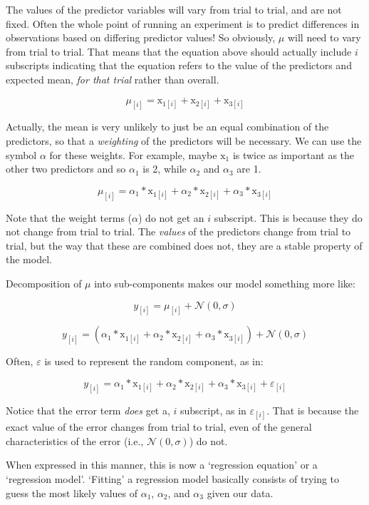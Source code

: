 \documentclass[
]{book}
\begin{document}
The values of the predictor variables will vary from trial to trial, and are not fixed. Often the whole point of running an experiment is to predict differences in observations based on differing predictor values! So obviously, \(\mu\) will need to vary from trial to trial. That means that the equation above should actually include \(i\) subscripts indicating that the equation refers to the value of the predictors and expected mean, \emph{for that trial} rather than overall.

\[
\mu_{[i]} = \mathrm{x}_{1[i]} + \mathrm{x}_{2[i]} + \mathrm{x}_{3[i]} \label{eq:5}
\]

Actually, the mean is very unlikely to just be an equal combination of the predictors, so that a \emph{weighting} of the predictors will be necessary. We can use the symbol \(\alpha\) for these weights. For example, maybe \(\mathrm{x}_{1}\) is twice as important as the other two predictors and so \(\alpha_1\) is 2, while \(\alpha_2\) and \(\alpha_3\) are 1.

\[
\mu_{[i]} = \alpha_1*\mathrm{x}_{1[i]} + \alpha_2*\mathrm{x}_{2[i]} + \alpha_3*\mathrm{x}_{3[i]}  
\label{eq:6}
\]

Note that the weight terms (\(\alpha\)) do not get an \(i\) subscript. This is because they do not change from trial to trial. The \emph{values} of the predictors change from trial to trial, but the way that these are combined does not, they are a stable property of the model.

Decomposition of \(\mu\) into sub-components makes our model something more like:

\[
y_{[i]} = \mu_{[i]} + \mathcal{N}(0,\sigma)  
\label{eq:7}
\]

\[
y_{[i]} =  (\alpha_1*\mathrm{x}_{1[i]} + \alpha_2*\mathrm{x}_{2[i]} + \alpha_3*\mathrm{x}_{3[i]} ) + \mathcal{N}(0,\sigma)  
\label{eq:8}
\]

Often, \(\varepsilon\) is used to represent the random component, as in:

\[
y_{[i]} = \alpha_1*\mathrm{x}_{1[i]} + \alpha_2*\mathrm{x}_{2[i]} + \alpha_3*\mathrm{x}_{3[i]}+ \varepsilon_{[i]}
\label{eq:9}
\]

Notice that the error term \emph{does} get a, \(i\) subscript, as in \(\varepsilon_{[i]}\). That is because the exact value of the error changes from trial to trial, even of the general characteristics of the error (i.e., \(\mathcal{N}(0,\sigma)\)) do not.

When expressed in this manner, this is now a `regression equation' or a `regression model'. `Fitting' a regression model basically consists of trying to guess the most likely values of \(\alpha_1\), \(\alpha_2\), and \(\alpha_3\) given our data.
\end{document}
